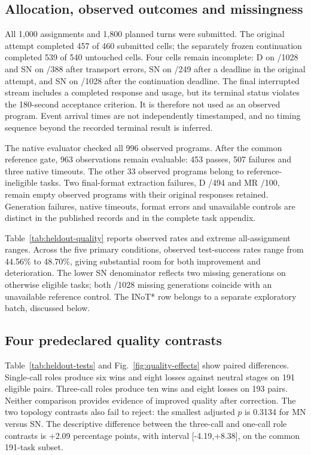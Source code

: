 \subsection{Allocation, observed outcomes and missingness}
All 1,000 assignments and 1,800 planned turns were submitted. The original attempt completed 457 of 460 submitted cells; the separately frozen continuation completed 539 of 540 untouched cells. Four cells remain incomplete: D on /1028 and SN on /388 after transport errors, SN on /249 after a deadline in the original attempt, and SN on /1028 after the continuation deadline. The final interrupted stream includes a completed response and usage, but its terminal status violates the 180-second acceptance criterion. It is therefore not used as an observed program. Event arrival times are not independently timestamped, and no timing sequence beyond the recorded terminal result is inferred.

The native evaluator checked all 996 observed programs. After the common reference gate, 963 observations remain evaluable: 453 passes, 507 failures and three native timeouts. The other 33 observed programs belong to reference-ineligible tasks. Two final-format extraction failures, D /494 and MR /100, remain empty observed programs with their original responses retained. Generation failures, native timeouts, format errors and unavailable controls are distinct in the published records and in the complete task appendix.

Table~\ref{tab:heldout-quality} reports observed rates and extreme all-assignment ranges. Across the five primary conditions, observed test-success rates range from 44.56\% to 48.70\%, giving substantial room for both improvement and deterioration. The lower SN denominator reflects two missing generations on otherwise eligible tasks; both /1028 missing generations coincide with an unavailable reference control. The INoT* row belongs to a separate exploratory batch, discussed below.


\subsection{Four predeclared quality contrasts}
Table~\ref{tab:heldout-tests} and Fig.~\ref{fig:quality-effects} show paired differences. Single-call roles produce six wins and eight losses against neutral stages on 191 eligible pairs. Three-call roles produce ten wins and eight losses on 193 pairs. Neither comparison provides evidence of improved quality after correction. The two topology contrasts also fail to reject: the smallest adjusted $p$ is 0.3134 for MN versus SN. The descriptive difference between the three-call and one-call role contrasts is +2.09 percentage points, with interval [-4.19,+8.38], on the common 191-task subset.

